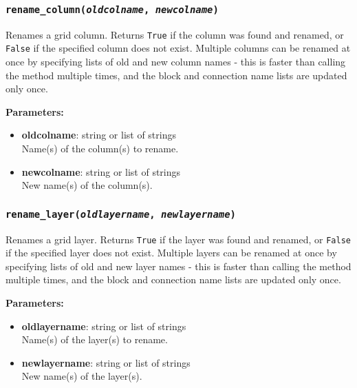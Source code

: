 \begin{snugshade}\subsubsection{\texttt{rename\_column(\emph{oldcolname}, \emph{newcolname})}}\end{snugshade}
\label{sec:mulgrid:rename_column}

Renames a grid column.  Returns \texttt{True} if the column was found and renamed, or \texttt{False} if the specified column does not exist.  Multiple columns can be renamed at once by specifying lists of old and new column names - this is faster than calling the method multiple times, and the block and connection name lists are updated only once.

\textbf{Parameters:}
\begin{itemize}
  \item \textbf{oldcolname}: string or list of strings\\
    Name(s) of the column(s) to rename.
  \item \textbf{newcolname}: string or list of strings\\
    New name(s) of the column(s).
\end{itemize}

\begin{snugshade}\subsubsection{\texttt{rename\_layer(\emph{oldlayername}, \emph{newlayername})}}\end{snugshade}
\label{sec:mulgrid:rename_layer}

Renames a grid layer.  Returns \texttt{True} if the layer was found and renamed, or \texttt{False} if the specified layer does not exist.  Multiple layers can be renamed at once by specifying lists of old and new layer names - this is faster than calling the method multiple times, and the block and connection name lists are updated only once.

\textbf{Parameters:}
\begin{itemize}
  \item \textbf{oldlayername}: string or list of strings\\
    Name(s) of the layer(s) to rename.
  \item \textbf{newlayername}: string or list of strings\\
    New name(s) of the layer(s).
\end{itemize}

